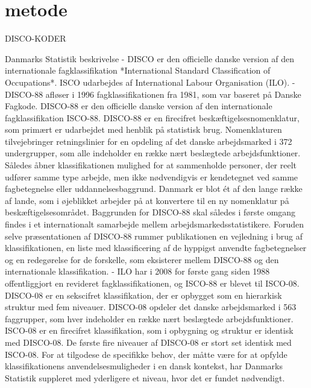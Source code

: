 
\chapter{metode} \label{metode}







DISCO-KODER

Danmarks Statistik beskrivelse
- DISCO er den officielle danske version af den internationale fagklassifikation *International Standard Classification of Occupations*. ISCO udarbejdes af International Labour Organisation (ILO).
- DISCO-88 afløser i 1996 fagklassifikationen fra 1981, som var baseret på Danske Fagkode. DISCO-88 er den officielle danske version af den internationale fagklassifikation ISCO-88. DISCO-88 er en firecifret beskæftigelsesnomenklatur, som primært er udarbejdet med henblik på statistisk brug. Nomenklaturen tilvejebringer retningslinier for en opdeling af det danske arbejdsmarked i 372 undergrupper, som alle indeholder en række nært beslægtede arbejdsfunktioner. Således åbner klassifikationen mulighed for at sammenholde personer, der reelt udfører samme type arbejde, men ikke nødvendigvis er kendetegnet ved samme fagbetegnelse eller uddannelsesbaggrund. Danmark er blot ét af den lange række af lande, som i øjeblikket arbejder på at konvertere til en ny nomenklatur på beskæftigelsesområdet. Baggrunden for DISCO-88 skal således i første omgang findes i et internationalt samarbejde mellem arbejdsmarkedsstatistikere. Foruden selve præsentationen af DISCO-88 rummer publikationen en vejledning i brug af klassifikationen, en liste med klassificering af de hyppigst anvendte fagbetegnelser og en redegørelse for de forskelle, som eksisterer mellem DISCO-88 og den internationale klassifikation.
- ILO har i 2008 for første gang siden 1988 offentliggjort en revideret fagklassifikationen, og ISCO-88 er blevet til ISCO-08. DISCO-08 er en sekscifret klassifikation, der er opbygget som en hierarkisk struktur med fem niveauer. DISCO-08 opdeler det danske arbejdsmarked i 563 faggrupper, som hver indeholder en række nært beslægtede arbejdsfunktioner. ISCO-08 er en firecifret klassifikation, som i opbygning og struktur er identisk med DISCO-08. De første fire niveauer af DISCO-08 er stort set identisk med ISCO-08. For at tilgodese de specifikke behov, der måtte være for at opfylde klassifikationens anvendelsesmuligheder i en dansk kontekst, har Danmarks Statistik suppleret med yderligere et niveau, hvor det er fundet nødvendigt. 

